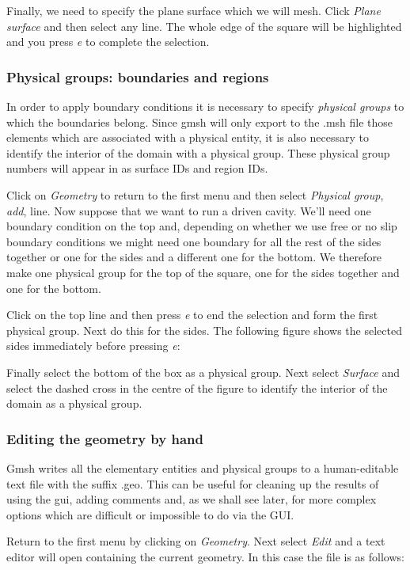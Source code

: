 Finally, we need to specify the plane surface which we will mesh. Click
\textit{Plane surface} and then select any line. The whole edge of the
square will be highlighted and you press \textit{e} to complete the
selection.

\subsubsection{Physical groups: boundaries and regions}
In order to apply boundary conditions it is necessary to specify
\textit{physical groups} to which the boundaries belong. Since gmsh will
only export to the .msh file those elements which are associated with a
physical entity, it is also necessary to identify the interior of the domain
with a physical group. These physical group numbers will appear in \fluidity
as surface IDs and region IDs. 

Click on \textit{Geometry} to return to the first menu and then select
\textit{Physical group}, \textit{add}, line. Now suppose that we want to run
a driven cavity. We'll need one boundary condition on the top and, depending
on whether we use free or no slip boundary conditions we might need one
boundary for all the rest of the sides together or one for the sides and a
different one for the bottom. We therefore make one physical group for the
top of the square, one for the sides together and one for the bottom.

Click on the top line and then press \textit{e} to end the selection and
form the first physical group. Next do this for the sides. The following
figure shows the selected sides immediately before pressing \textit{e}:

Finally select the bottom of the box as a physical group. Next select
\textit{Surface} and select the dashed cross in the centre of the figure to
identify the interior of the domain as a physical group.

\subsubsection{Editing the geometry by hand}

Gmsh writes all the elementary entities and physical groups to a human-editable text file with the suffix .geo. This can be useful for cleaning up the results of using the gui, adding comments and, as we shall see later, for more complex options which are difficult or impossible to do via the GUI.

Return to the first menu by clicking on \textit{Geometry}. Next select \textit{Edit} and a text editor will open containing the current geometry. In this case the file is as follows:

